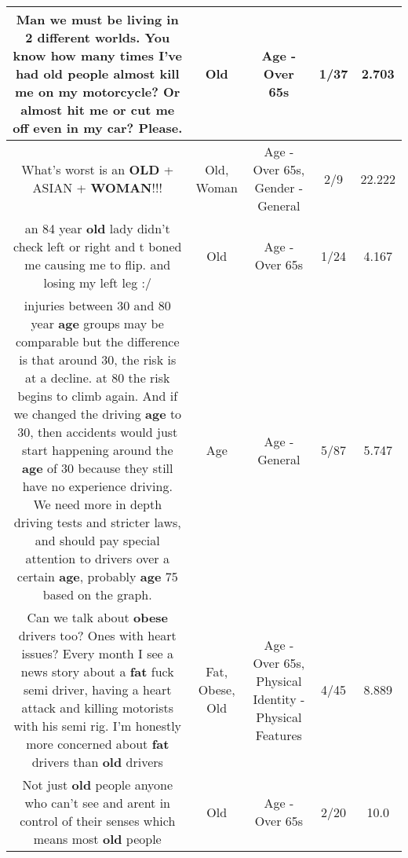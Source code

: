 \documentclass[11pt]{article}
\newlength\mylength
\begin{document}
\begin{center}
\begin{longtable}{|C{.65\mylength}|C{.30\mylength}|C{.12\mylength}|C{.12\mylength}|C{.12\mylength}|}
  \small Man we must be living in 2 different worlds. You know how many times I've had \textbf{old} people almost kill me on my motorcycle? Or almost hit me or cut me off even in my car? Please.\normalsize   & Old & Age - Over 65s & 1/37 & 2.703 \\  \hline
  \small What's worst is an \textbf{OLD} + ASIAN + \textbf{WOMAN}!!!\normalsize   & Old, Woman & Age - Over 65s, Gender - General & 2/9 & 22.222 \\  \hline
  \small an 84 year \textbf{old} lady didn't check left or right and t boned me causing me to flip. and losing my left leg :/\normalsize   & Old & Age - Over 65s & 1/24 & 4.167 \\  \hline
  \small injuries between 30 and 80 year \textbf{age} groups may be comparable but the difference is that around 30, the risk is at a decline. at 80 the risk begins to climb again. And if we changed the driving \textbf{age} to 30, then accidents would just start happening around the \textbf{age} of 30 because they still have no experience driving. We need more in depth driving tests and stricter laws, and should pay special attention to drivers over a certain \textbf{age}, probably \textbf{age} 75 based on the graph.\normalsize   & Age & Age - General & 5/87 & 5.747 \\  \hline
  \small Can we talk about \textbf{obese} drivers too? Ones with heart issues? Every month I see a news story about a \textbf{fat} fuck semi driver, having a heart attack and killing motorists with his semi rig. I'm honestly more concerned about \textbf{fat} drivers than \textbf{old} drivers\normalsize   & Fat, Obese, Old & Age - Over 65s, Physical Identity - Physical Features & 4/45 & 8.889 \\  \hline
  \small Not just \textbf{old} people anyone who can't see and arent in control of their senses which means most \textbf{old} people\normalsize   & Old & Age - Over 65s & 2/20 & 10.0 \\  \hline

\end{longtable}
\end{center}
\end{document}

